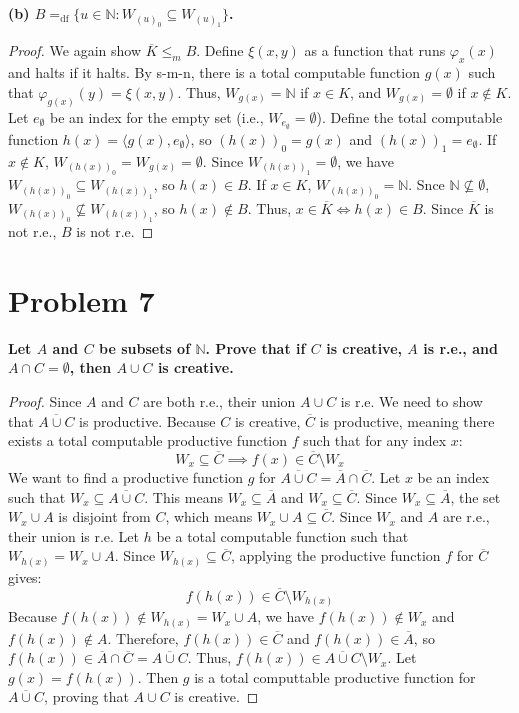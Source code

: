 \documentclass{article}
\begin{document}
\textbf{(b) $B =_{\text{df}} \{u \in \mathbb{N} : W_{(u)_0} \subseteq W_{(u)_1}\}$.}

\begin{proof}
We again show $\overline{K} \leq_m B$.
Define $\xi(x, y)$ as a function that runs $\varphi_x(x)$ and halts if it halts. By s-m-n, there is a total computable function $g(x)$ such that $\varphi_{g(x)}(y) = \xi(x, y)$. Thus, $W_{g(x)} = \mathbb{N}$ if $x \in K$, and $W_{g(x)} = \emptyset$ if $x \notin K$.
Let $e_{\emptyset}$ be an index for the empty set (i.e., $W_{e_{\emptyset}} = \emptyset$).
Define the total computable function $h(x) = \langle g(x), e_{\emptyset} \rangle$, so $(h(x))_0 = g(x)$ and $(h(x))_1 = e_{\emptyset}$.
If $x \notin K$, $W_{(h(x))_0} = W_{g(x)} = \emptyset$. Since $W_{(h(x))_1} = \emptyset$, we have $W_{(h(x))_0} \subseteq W_{(h(x))_1}$, so $h(x) \in B$.
If $x \in K$, $W_{(h(x))_0} = \mathbb{N}$. Snce $\mathbb{N} \not\subseteq \emptyset$, $W_{(h(x))_0} \not\subseteq W_{(h(x))_1}$, so $h(x) \notin B$.
Thus, $x \in \overline{K} \iff h(x) \in B$. Since $\overline{K}$ is not r.e., $B$ is not r.e.
\end{proof}

\hrulefill

\section*{Problem 7}
\textbf{Let $A$ and $C$ be subsets of $\mathbb{N}$. Prove that if $C$ is creative, $A$ is r.e., and $A \cap C = \emptyset$, then $A \cup C$ is creative.}

\begin{proof}
Since $A$ and $C$ are both r.e., their union $A \cup C$ is r.e. We need to show that $\overline{A \cup C}$ is productive.
Because $C$ is creative, $\overline{C}$ is productive, meaning there exists a total computable productive function $f$ such that for any index $x$:
\[ W_x \subseteq \overline{C} \implies f(x) \in \overline{C} \setminus W_x \]
We want to find a productive function $g$ for $\overline{A \cup C} = \overline{A} \cap \overline{C}$.
Let $x$ be an index such that $W_x \subseteq \overline{A \cup C}$. This means $W_x \subseteq \overline{A}$ and $W_x \subseteq \overline{C}$.
Since $W_x \subseteq \overline{A}$, the set $W_x \cup A$ is disjoint from $C$, which means $W_x \cup A \subseteq \overline{C}$.
Since $W_x$ and $A$ are r.e., their union is r.e. Let $h$ be a total computable function such that $W_{h(x)} = W_x \cup A$.
Since $W_{h(x)} \subseteq \overline{C}$, applying the productive function $f$ for $\overline{C}$ gives:
\[ f(h(x)) \in \overline{C} \setminus W_{h(x)} \]
Because $f(h(x)) \notin W_{h(x)} = W_x \cup A$, we have $f(h(x)) \notin W_x$ and $f(h(x)) \notin A$.
Therefore, $f(h(x)) \in \overline{C}$ and $f(h(x)) \in \overline{A}$, so $f(h(x)) \in \overline{A} \cap \overline{C} = \overline{A \cup C}$.
Thus, $f(h(x)) \in \overline{A \cup C} \setminus W_x$. 
Let $g(x) = f(h(x))$. Then $g$ is a total computtable productive function for $\overline{A \cup C}$, proving that $A \cup C$ is creative.
\end{proof}
\end{document}
